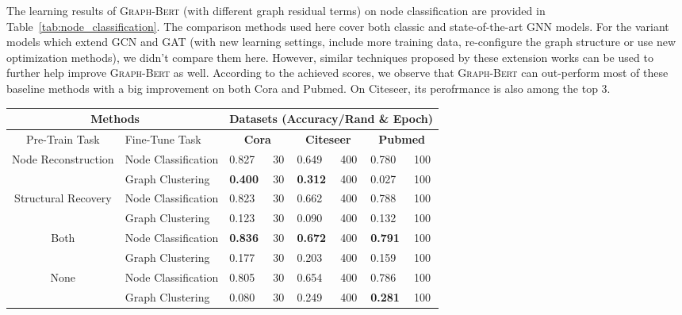 \documentclass{article}
\newcommand{\our}{\textsc{Graph-Bert}}
\newcommand{\gcn}{\textsc{GCN}}
\newcommand{\gat}{\textsc{GAT}}
\begin{document}
The learning results of {\our} (with different graph residual terms) on node classification are provided in Table~\ref{tab:node_classification}. The comparison methods used here cover both classic and state-of-the-art GNN models. For the variant models which extend {\gcn} and {\gat} (with new learning settings, include more training data, re-configure the graph structure or use new optimization methods), we didn't compare them here. However, similar techniques proposed by these extension works can be used to further help improve {\our} as well. According to the achieved scores, we observe that {\our} can out-perform most of these baseline methods with a big improvement on both Cora and Pubmed. On Citeseer, its perofrmance is also among the top 3.

\begin{table*}[t]
\caption{Performance comparison of {\our} on fine-tuning tasks with/without pre-training. For all the models shown here, we will only use $\frac{1}{5}$ of the normal training max epochs as used by {\our} in Table~\ref{tab:node_classification}. For KMeans, the epoch denotes its max-iter parameter.}\label{tab:performance_summary}
\centering
\setlength{\tabcolsep}{3.5pt}
\begin{tabular}{|c|l|p{0.9cm}|p{1.2cm}|p{0.9cm}|p{1.2cm}|p{0.9cm}|p{1.2cm}| }
\hline
\multicolumn{2}{|c}{Methods } & \multicolumn{6}{|c|}{Datasets (Accuracy/Rand \& Epoch)} \\
\hline
Pre-Train Task & Fine-Tune Task & \multicolumn{2}{|c}{\textbf{Cora}} & \multicolumn{2}{|c}{\textbf{Citeseer}} & \multicolumn{2}{|c|}{\textbf{Pubmed}} \\
\hline 
\hline 
\multirow{2}{*}{Node Reconstruction}
&Node Classification&0.827 &30  &0.649 &400 &0.780 &100 \\
\cline{2-8}
&Graph Clustering&\textbf{0.400} &30  &\textbf{0.312} &400 &0.027 &100 \\
\hline
\hline
\multirow{2}{*}{Structural Recovery}
&Node Classification&0.823 &30  &0.662 &400 &0.788 &100 \\
\cline{2-8}
&Graph Clustering&0.123 &30  &0.090 &400 &0.132 &100 \\
\hline
\hline
\multirow{2}{*}{Both}
&Node Classification&\textbf{0.836} &30  &\textbf{0.672} &400 &\textbf{0.791} &100 \\
\cline{2-8}
&Graph Clustering&0.177 &30  &0.203 &400 &0.159 & 100 \\
\hline
\hline
\multirow{2}{*}{None}
&Node Classification&0.805 &30  &0.654 &400&0.786 &100 \\
\cline{2-8}
&Graph Clustering&0.080 &30  &0.249 &400 &\textbf{0.281} &100 \\
\hline
\end{tabular}
\end{table*}
\end{document}
